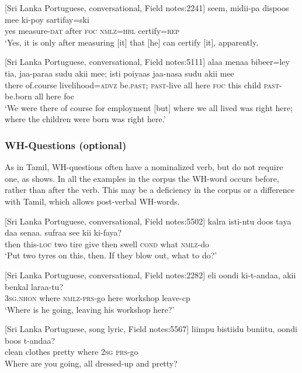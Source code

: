 \ea\label{smith:ex:54}
{}[Sri Lanka Portuguese, conversational, Field notes:2241]
\gll seem, midii-pa dispoos mee ki-poy sartifay=ski\\
yes measure-\textsc{dat} after \textsc{foc} \textsc{nmlz}=\textsc{hbl} certify=\textsc{rep}\\
`Yes, it is only after measuring [it] that [he] can certify [it], apparently.
\z


\ea\label{smith:ex:55}
{}[Sri Lanka Portuguese, conversational, Field notes:5111]
\gll alaa menaa bibeer=ley ti{\textltailn}a, jaa-paraa sudu akii mee; isti po{\textrtaild}iyaas jaa-nasa sudu akii mee\\
there of.course livelihood=\textsc{advz} be.\textsc{past}; \textsc{past}-live all here \textsc{foc} this child \textsc{past}-be.born all here foc\\
`We were there of course for employment [but] where we all lived was right here; where the children were born was right here.'
\z

\subsubsection{WH-Questions (optional)}%
As in Tamil, WH-questions often have a nominalized verb, but do not require one, as  shows. In all the examples in the corpus the WH-word occurs before, rather than after the verb. This may be a deficiency in the corpus or a difference with Tamil, which allows post-verbal WH-words.

\ea\label{smith:ex:56}
{}[Sri Lanka Portuguese, conversational, Field notes:5502]
\gll {\textopeno}kal{\textopeno}{\textopeno}ra isti-ntu doos taya daa senaa. sufraa see kii ki-faya? \\
then this-\textsc{loc} two tire give then swell \textsc{cond} what \textsc{nmlz}-do\\
`Put two tyres on this, then. If they blow out, what to do?'
\z

\ea\label{smith:ex:57}
{}[Sri Lanka Portuguese, conversational, Field notes:2282]
\gll eli oondi ki-t-andaa, akii benkal laraa-tu?\\
3\textsc{sg}.\textsc{nhon} where \textsc{nmlz}-\textsc{prs}-go here workshop leave-cp\\
`Where is he going, leaving his workshop here?'
\z

\ea\label{smith:ex:58}
{}[Sri Lanka Portuguese, song lyric, Field notes:5567]
\gll liimpu bistiidu buniitu, oondi boos t-andaa?\\
clean clothes pretty where 2\textsc{sg} \textsc{prs}-go\\
Where are you going, all dressed-up and pretty?
\z

